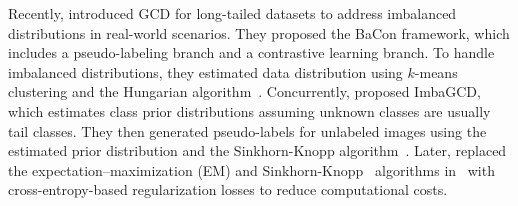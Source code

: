 
Recently, \cite{Bai2023Towards} introduced GCD for long-tailed datasets to address imbalanced distributions in real-world scenarios. They proposed the BaCon framework, which includes a pseudo-labeling branch and a contrastive learning branch. To handle imbalanced distributions, they estimated data distribution using $k$-means clustering and the Hungarian algorithm~\cite{kuhn1955hungarian}. Concurrently, \cite{li2023imbagcd} proposed ImbaGCD, which estimates class prior distributions assuming unknown classes are usually tail classes. They then generated pseudo-labels for unlabeled images using the estimated prior distribution and the Sinkhorn-Knopp algorithm~\cite{Cuturi2013Sinkhorn}. Later, \cite{li2023generalized} replaced the expectation–maximization (EM) and Sinkhorn-Knopp~\cite{Cuturi2013Sinkhorn} algorithms in~\cite{li2023imbagcd} with cross-entropy-based regularization losses to reduce computational costs.




